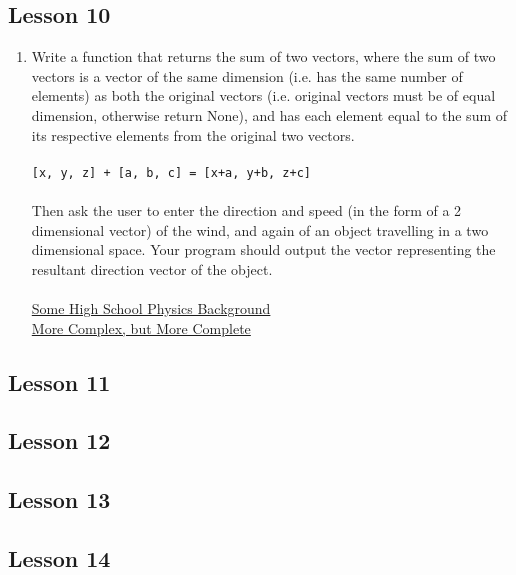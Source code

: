 \documentclass[a4paper,11pt]{article}
\begin{document}
\subsection{Lesson 10}

\begin{enumerate}
	\item       Write a function that returns the sum of two vectors, where the     sum of two vectors is a vector of the same dimension (i.e. has     the same number of elements) as both the original vectors (i.e.     original vectors must be of equal dimension, otherwise return     None), and has each element equal to the sum of its respective     elements from the original two vectors.
\\
\\
\texttt{[x, y, z] + [a, b, c] = [x+a, y+b, z+c]}
\\
\\     Then ask the user to enter the direction and speed (in the form     of a 2 dimensional vector) of the wind, and again of an object     travelling in a two dimensional space. Your program should     output the vector representing the resultant direction vector of     the object.
\\
\\\href{http://www.physicsclassroom.com/Class/vectors/U3L3a.html}{Some High School Physics Background}
\\\href{http://kipper.crk.umn.edu/physics/1012/xtr/vectors.html}{More Complex, but More Complete}
\end{enumerate}

\subsection{Lesson 11}


\subsection{Lesson 12}


\subsection{Lesson 13}


\subsection{Lesson 14}
\end{document}
